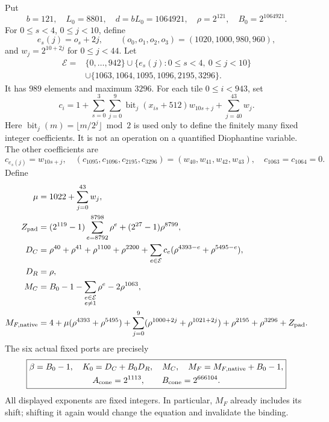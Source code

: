 \documentclass[11pt,a4paper]{article}
\theoremstyle{definition}\newtheorem{definition}[theorem]{Definition}
\theoremstyle{remark}\newtheorem{remark}[theorem]{Remark}
\numberwithin{equation}{section}
\begin{document}
Put
\[
b=121,\quad L_0=8801,\quad d=bL_0=1064921,\quad
\rho=2^{121},\quad B_0=2^{1064921}.
\]
For \(0\le s<4\), \(0\le j<10\), define
\[
e_s(j)=o_s+2j,\qquad(o_0,o_1,o_2,o_3)=(1020,1000,980,960),
\]
and \(w_j=2^{10+2j}\) for \(0\le j<44\). Let
\[
\begin{split}
\mathcal E={}&\{0,\ldots,942\}
 \cup\{e_s(j):0\le s<4,\ 0\le j<10\}\\
 &\cup\{1063,1064,1095,1096,2195,3296\}.
\end{split}
\]
It has \(989\) elements and maximum \(3296\).
For each tile \(0\le i<943\), set
\[
c_i=1+\sum_{s=0}^3\sum_{j=0}^9
       \operatorname{bit}_j(x_{is}+512)w_{10s+j}
       +\sum_{j=40}^{43}w_j .
\]
Here \(\operatorname{bit}_j(m)=\lfloor m/2^j\rfloor\bmod2\)
is used only to define the finitely many fixed integer coefficients.
It is not an operation on a quantified Diophantine variable.
The other coefficients are
\[
c_{e_s(j)}=w_{10s+j},\quad
(c_{1095},c_{1096},c_{2195},c_{3296})=(w_{40},w_{41},w_{42},w_{43}),
\quad c_{1063}=c_{1064}=0.
\]
Define
\begin{align*}
\mu&=1022+\sum_{j=0}^{43}w_j,\\
Z_{\rm pad}&=(2^{119}-1)\sum_{e=8792}^{8798}\rho^e
                +(2^{27}-1)\rho^{8799},\\
D_C&=\rho^{40}+\rho^{41}+\rho^{1100}+\rho^{2200}
       +\sum_{e\in\mathcal E}c_e(\rho^{4393-e}+\rho^{5495-e}),\\
D_R&=\rho,\\
M_C&=B_0-1-\sum_{\substack{e\in\mathcal E\\e\ne1}}\rho^e
                   -2\rho^{1063},\\
M_{F,\rm native}
 &=4+\mu(\rho^{4393}+\rho^{5495})
     +\sum_{j=0}^9(\rho^{1000+2j}+\rho^{1021+2j})
     +\rho^{2195}+\rho^{3296}+Z_{\rm pad}.
\end{align*}
The six actual fixed ports are precisely
\[
\boxed{\begin{gathered}
\beta=B_0-1,\quad K_0=D_C+B_0D_R,\quad M_C,\quad
M_F=M_{F,\rm native}+B_0-1,\\
A_{\rm cone}=2^{1113},\qquad B_{\rm cone}=2^{666104}.
\end{gathered}}
\]
All displayed exponents are fixed integers. In particular,
\(M_F\) already includes its shift; shifting it again would change
the equation and invalidate the binding.
\end{document}
